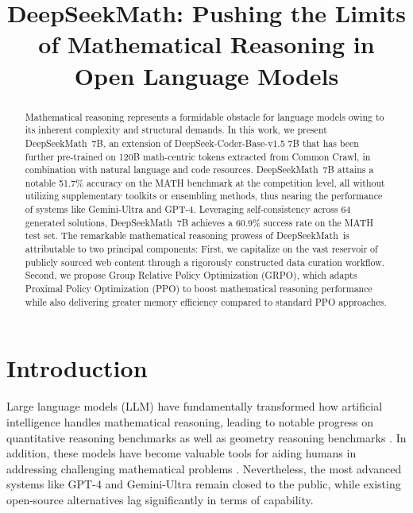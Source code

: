 \title{DeepSeekMath: Pushing the Limits of Mathematical Reasoning in Open Language Models}

\begin{abstract}
Mathematical reasoning represents a formidable obstacle for language models owing to its inherent complexity and structural demands. In this work, we present DeepSeekMath~7B, an extension of DeepSeek-Coder-Base-v1.5 7B that has been further pre-trained on 120B math-centric tokens extracted from Common Crawl, in combination with natural language and code resources. DeepSeekMath~7B attains a notable 51.7\% accuracy on the MATH benchmark at the competition level, all without utilizing supplementary toolkits or ensembling methods, thus nearing the performance of systems like Gemini-Ultra and GPT-4. Leveraging self-consistency across 64 generated solutions, DeepSeekMath~7B achieves a 60.9\% success rate on the MATH test set. The remarkable mathematical reasoning prowess of DeepSeekMath~is attributable to two principal components: First, we capitalize on the vast reservoir of publicly sourced web content through a rigorously constructed data curation workflow. Second, we propose Group Relative Policy Optimization (GRPO), which adapts Proximal Policy Optimization (PPO) to boost mathematical reasoning performance while also delivering greater memory efficiency compared to standard PPO approaches.
\end{abstract}

\section{Introduction}

Large language models (LLM) have fundamentally transformed how artificial intelligence handles mathematical reasoning, leading to notable progress on quantitative reasoning benchmarks \citep{MATH} as well as geometry reasoning benchmarks \citep{trinh2024solving}. In addition, these models have become valuable tools for aiding humans in addressing challenging mathematical problems \citep{tao}. Nevertheless, the most advanced systems like GPT-4 \citep{gpt4} and Gemini-Ultra \citep{gemini} remain closed to the public, while existing open-source alternatives lag significantly in terms of capability.

